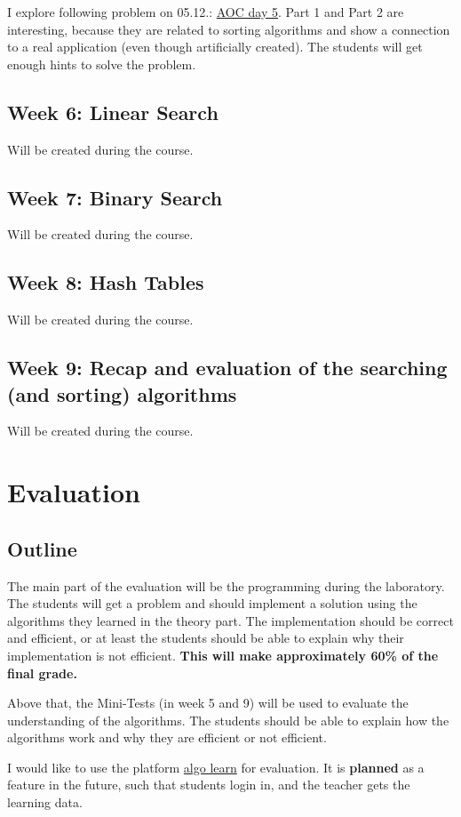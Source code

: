 \documentclass[10pt, oneside]{article}
\theoremstyle{remark}
\begin{document}
I explore following problem on 05.12.: \href{https://adventofcode.com/2024/day/5}{AOC day 5}. Part 1 and Part 2 are interesting, because they are related to sorting algorithms and show a connection to a real application (even though artificially created). The students will get enough hints to solve the problem. 

\subsection{Week 6: Linear Search}
Will be created during the course.

\subsection{Week 7: Binary Search}
Will be created during the course.

\subsection{Week 8: Hash Tables}
Will be created during the course.

\subsection{Week 9: Recap and evaluation of the searching (and sorting) algorithms}
Will be created during the course.

\section{Evaluation}
\subsection{Outline}
The main part of the evaluation will be the programming during the laboratory. The students will get a problem and should implement a solution using the algorithms they learned in the theory part. The implementation should be correct and efficient, or at least the students should be able to explain why their implementation is not efficient. \textbf{This will make approximately 60\% of the final grade.}

Above that, the Mini-Tests (in week 5 and 9) will be used to evaluate the understanding of the algorithms. The students should be able to explain how the algorithms work and why they are efficient or not efficient. 

\begin{tcolorbox}
  I would like to use the platform \href{https://tcs.uni-frankfurt.de/algo-learn-testing/refs_heads_feat-bubbleSort/en}{algo learn} for evaluation. It is \textbf{planned} as a feature in the future, such that students login in, and the teacher gets the learning data.
\end{tcolorbox}
\end{document}
